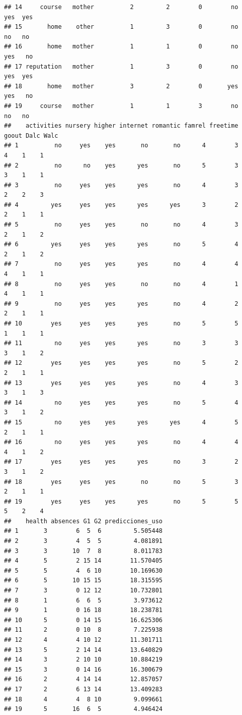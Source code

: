 \documentclass[
]{article}
\begin{document}
\begin{verbatim}
## 14     course   mother          2         2        0        no    yes  yes
## 15       home    other          1         3        0        no     no   no
## 16       home   mother          1         1        0        no    yes   no
## 17 reputation   mother          1         3        0        no    yes  yes
## 18       home   mother          3         2        0       yes    yes   no
## 19     course   mother          1         1        3        no     no   no
##    activities nursery higher internet romantic famrel freetime goout Dalc Walc
## 1          no     yes    yes       no       no      4        3     4    1    1
## 2          no      no    yes      yes       no      5        3     3    1    1
## 3          no     yes    yes      yes       no      4        3     2    2    3
## 4         yes     yes    yes      yes      yes      3        2     2    1    1
## 5          no     yes    yes       no       no      4        3     2    1    2
## 6         yes     yes    yes      yes       no      5        4     2    1    2
## 7          no     yes    yes      yes       no      4        4     4    1    1
## 8          no     yes    yes       no       no      4        1     4    1    1
## 9          no     yes    yes      yes       no      4        2     2    1    1
## 10        yes     yes    yes      yes       no      5        5     1    1    1
## 11         no     yes    yes      yes       no      3        3     3    1    2
## 12        yes     yes    yes      yes       no      5        2     2    1    1
## 13        yes     yes    yes      yes       no      4        3     3    1    3
## 14         no     yes    yes      yes       no      5        4     3    1    2
## 15         no     yes    yes      yes      yes      4        5     2    1    1
## 16         no     yes    yes      yes       no      4        4     4    1    2
## 17        yes     yes    yes      yes       no      3        2     3    1    2
## 18        yes     yes    yes       no       no      5        3     2    1    1
## 19        yes     yes    yes      yes       no      5        5     5    2    4
##    health absences G1 G2 predicciones_uso
## 1       3        6  5  6         5.505448
## 2       3        4  5  5         4.081891
## 3       3       10  7  8         8.011783
## 4       5        2 15 14        11.570405
## 5       5        4  6 10        10.169630
## 6       5       10 15 15        18.315595
## 7       3        0 12 12        10.732801
## 8       1        6  6  5         3.973612
## 9       1        0 16 18        18.238781
## 10      5        0 14 15        16.625306
## 11      2        0 10  8         7.225938
## 12      4        4 10 12        11.301711
## 13      5        2 14 14        13.640829
## 14      3        2 10 10        10.884219
## 15      3        0 14 16        16.300679
## 16      2        4 14 14        12.857057
## 17      2        6 13 14        13.409283
## 18      4        4  8 10         9.099661
## 19      5       16  6  5         4.946424
\end{verbatim}
\end{document}
